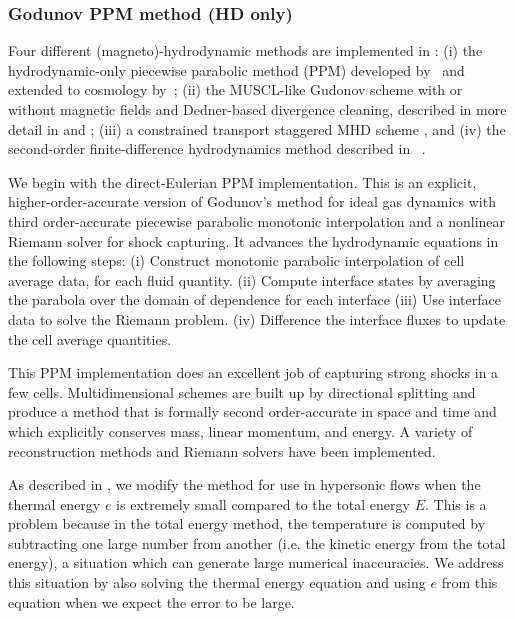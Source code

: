 \subsubsection{Godunov PPM method (HD only)}

Four different (magneto)-hydrodynamic methods are implemented in
\enzo: (i) the hydrodynamic-only piecewise parabolic method (PPM)
developed by~\citet{1984JCoPh..54..174C} and extended to cosmology
by~\citet{1995CoPhC..89..149B}; (ii) the MUSCL-like Gudonov scheme
\citep{MUSCL} with or without magnetic fields and Dedner-based
divergence cleaning, described in more detail in
\citet{WangAbelZhang08} and \citet{WangAbel09}; (iii) a constrained
transport staggered MHD scheme \citep{Collins10}, and (iv) the
second-order finite-difference hydrodynamics method described in
\zeus~\citep{Stone92a,Stone92b}.

We begin with the direct-Eulerian PPM implementation.  This is an
explicit, higher-order-accurate version of Godunov's method for ideal
gas dynamics with third order-accurate piecewise parabolic monotonic
interpolation and a nonlinear Riemann solver for shock capturing.  It
advances the hydrodynamic equations in the following steps:
 (i) Construct monotonic parabolic interpolation of cell average data, for each fluid quantity.
(ii) Compute interface states by averaging the parabola over the domain of dependence for each interface
(iii) Use interface data to solve the Riemann problem.
 (iv) Difference the interface fluxes to update the cell average quantities.

This PPM implementation does an excellent job of capturing strong
shocks in a few cells.  Multidimensional schemes are built up by
directional splitting and produce a method that is formally second
order-accurate in space and time and which explicitly conserves mass,
linear momentum, and energy.  A variety of reconstruction methods and
Riemann solvers have been implemented.

As described in \citet{Bryan95}, we modify the method for use in
hypersonic flows when the thermal energy $e$ is extremely small
compared to the total energy $E$.  This is a problem because in the
total energy method, the temperature is computed by subtracting one
large number from another (i.e. the kinetic energy from the total
energy), a situation which can generate large numerical inaccuracies.
We address this situation by also solving the thermal energy equation
and using $e$ from this equation when we expect the error to be large.

